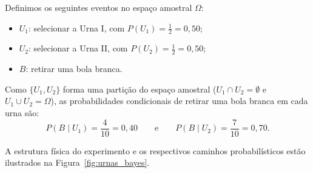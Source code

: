 
Definimos os seguintes eventos no espaço amostral $\Omega$:
\begin{itemize}
    \item $U_1$: selecionar a Urna I, com $P(U_1) = \frac{1}{2} = 0,50$;
    \item $U_2$: selecionar a Urna II, com $P(U_2) = \frac{1}{2} = 0,50$;
    \item $B$: retirar uma bola branca.
\end{itemize}

Como $\{U_1, U_2\}$ forma uma partição do espaço amostral ($U_1 \cap U_2 = \emptyset$ e $U_1 \cup U_2 = \Omega$), as probabilidades condicionais de retirar uma bola branca em cada urna são:
\[
P(B \mid U_1) = \frac{4}{10} = 0,40 \qquad \text{e} \qquad P(B \mid U_2) = \frac{7}{10} = 0,70.
\]

A estrutura física do experimento e os respectivos caminhos probabilísticos estão ilustrados na Figura~\ref{fig:urnas_bayes}.

